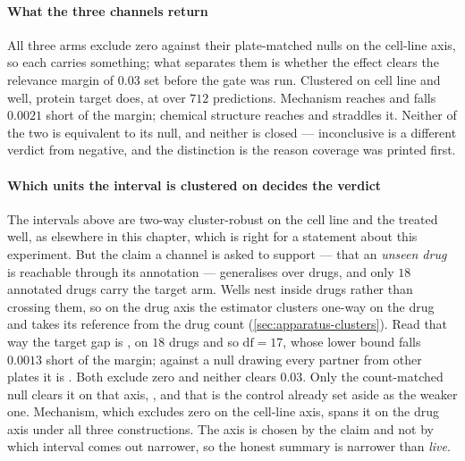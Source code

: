 

\paragraph{What the three channels return} All three arms exclude zero against
their plate-matched nulls on the cell-line axis, so each carries something; what
separates them is whether the effect clears the relevance margin of $0.03$ set
before the gate was run. Clustered on cell line and well, protein target does, at
 over $712$ predictions. Mechanism reaches
 and falls $0.0021$ short of the margin; chemical
structure reaches  and straddles it. Neither of the
two is equivalent to its null, and neither is closed --- inconclusive is a
different verdict from negative, and the distinction is the reason coverage was
printed first.

\paragraph{Which units the interval is clustered on decides the verdict} The
intervals above are two-way cluster-robust on the cell line and the treated well,
as elsewhere in this chapter, which is right for a statement about this
experiment. But the claim a channel is asked to support --- that an \emph{unseen
drug} is reachable through its annotation --- generalises over drugs, and only
$18$ annotated drugs carry the target arm. Wells nest inside drugs rather than
crossing them, so on the drug axis the estimator clusters one-way on the drug and
takes its reference from the drug count (\cref{sec:apparatus-clusters}). Read that
way the target gap is , on $18$ drugs and so
$\mathrm{df} = 17$,
whose lower bound falls $0.0013$ short of the margin; against a null drawing every
partner from other plates it is . Both exclude zero
and neither clears $0.03$. Only the count-matched null clears it on that axis,
, and that is the control already set aside as the
weaker one. Mechanism, which excludes zero on the cell-line axis, spans it on the
drug axis under all three constructions. The axis is chosen by the claim and not
by which interval comes out narrower, so the honest summary is narrower than
\emph{live}.

